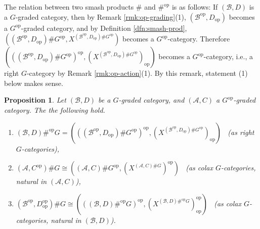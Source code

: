 \documentclass{surv-l}
\numberwithin{equation}{chapter}
\numberwithin{figure}{chapter}
\theoremstyle{plain}
\newtheorem{prp}[thm]{Proposition}
\theoremstyle{definition}
\theoremstyle{remark}
\begin{document}
The relation between two smash products $\#$ and $\#^{\mathrm{op}}$ is as follows:
If $(\mathcal{B}, D)$ is a $G$-graded category, then by Remark  \ref{rmk:op-grading}(1),
$(\mathcal{B}^{\mathrm{op}}, D_\mathrm{op})$ becomes a $G^{\mathrm{op}}$-graded category,
and by Definition \ref{dfn:smash-prod},
$((\mathcal{B}^{\mathrm{op}}, D_\mathrm{op}) \# G^{\mathrm{op}}, X^{(\mathcal{B}^{\mathrm{op}}, D_\mathrm{op}) \# G^{\mathrm{op}}})$
becomes a $G^{\mathrm{op}}$-category.
Therefore
$(((\mathcal{B}^{\mathrm{op}}, D_\mathrm{op}) \# G^{\mathrm{op}})^{\mathrm{op}}, (X^{(\mathcal{B}^{\mathrm{op}}, D_\mathrm{op}) \# G^{\mathrm{op}}})_\mathrm{op})$
becomes a $G^{\mathrm{op}}$-category, i.e., a right $G$-category by Remark \ref{rmk:op-action}(1).
By this remark, statement (1) below makes sense. %

\begin{prp}\label{prp:rel-smash-op}
Let $(\mathcal{B}, D)$ be a $G$-graded category,
and $(\mathcal{A}, C)$ a $G^{\mathrm{op}}$-graded category.
The the following hold.

\begin{enumerate}
\item
$(\mathcal{B}, D) \#^{\mathrm{op}} G = (((\mathcal{B}^{\mathrm{op}}, D_\mathrm{op}) \# G^{\mathrm{op}})^{\mathrm{op}}, (X^{(\mathcal{B}^{\mathrm{op}}, D_\mathrm{op}) \# G^{\mathrm{op}}})_\mathrm{op})$
\
{\rm (}as right $G$-categories{\rm )},
\item
$(\mathcal{A}, C^{\mathrm{op}})\# G \!\cong\! ((\mathcal{A}, C)\# G^{\mathrm{op}}, (X^{(\mathcal{A}, C)\# G})^{\mathrm{op}})$
\
{\rm (}as colax $G$-categories, natural in $(\mathcal{A}, C)${\rm )},
\item
$(\mathcal{B}^{\mathrm{op}}, D_\mathrm{op}^{\mathrm{op}})\# G \cong (((\mathcal{B}, D)\#^{\mathrm{op}} G)^{\mathrm{op}}, (X^{(\mathcal{B}, D)\#^{\mathrm{op}} G})_\mathrm{op}^{\mathrm{op}})$
\
{\rm (}as colax $G$-cate\-gories, natural in $(\mathcal{B}, D)${\rm )}.
\end{enumerate}
\end{prp}
\end{document}
